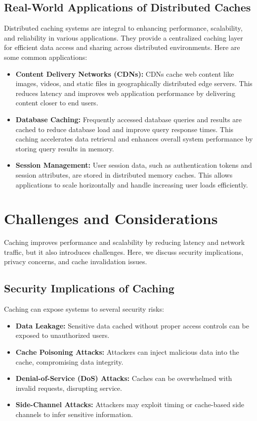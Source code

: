\documentclass[12pt]{book} %
\begin{document}
\subsection{Real-World Applications of Distributed Caches}

Distributed caching systems are integral to enhancing performance, scalability, and reliability in various applications. They provide a centralized caching layer for efficient data access and sharing across distributed environments. Here are some common applications:

\begin{itemize}
    \item \textbf{Content Delivery Networks (CDNs):} CDNs cache web content like images, videos, and static files in geographically distributed edge servers. This reduces latency and improves web application performance by delivering content closer to end users.
    
    \item \textbf{Database Caching:} Frequently accessed database queries and results are cached to reduce database load and improve query response times. This caching accelerates data retrieval and enhances overall system performance by storing query results in memory.
    
    \item \textbf{Session Management:} User session data, such as authentication tokens and session attributes, are stored in distributed memory caches. This allows applications to scale horizontally and handle increasing user loads efficiently.
\end{itemize}


\section{Challenges and Considerations}

Caching improves performance and scalability by reducing latency and network traffic, but it also introduces challenges. Here, we discuss security implications, privacy concerns, and cache invalidation issues.

\subsection{Security Implications of Caching}

Caching can expose systems to several security risks:

\begin{itemize}
    \item \textbf{Data Leakage:} Sensitive data cached without proper access controls can be exposed to unauthorized users.
    \item \textbf{Cache Poisoning Attacks:} Attackers can inject malicious data into the cache, compromising data integrity.
    \item \textbf{Denial-of-Service (DoS) Attacks:} Caches can be overwhelmed with invalid requests, disrupting service.
    \item \textbf{Side-Channel Attacks:} Attackers may exploit timing or cache-based side channels to infer sensitive information.
\end{itemize}
\end{document}
